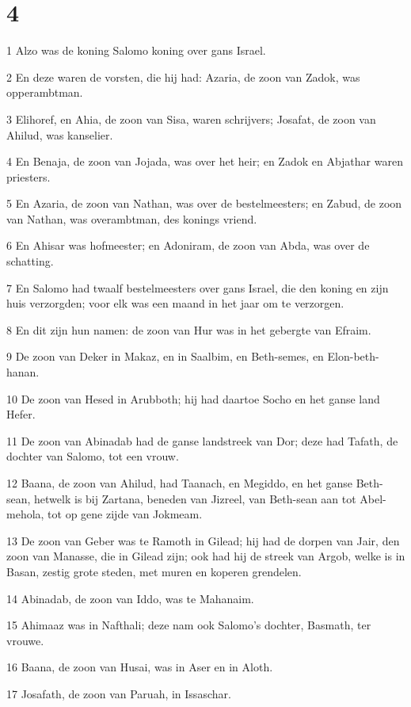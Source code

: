 \chapter{4}

\par 1 Alzo was de koning Salomo koning over gans Israel.
\par 2 En deze waren de vorsten, die hij had: Azaria, de zoon van Zadok, was opperambtman.
\par 3 Elihoref, en Ahia, de zoon van Sisa, waren schrijvers; Josafat, de zoon van Ahilud, was kanselier.
\par 4 En Benaja, de zoon van Jojada, was over het heir; en Zadok en Abjathar waren priesters.
\par 5 En Azaria, de zoon van Nathan, was over de bestelmeesters; en Zabud, de zoon van Nathan, was overambtman, des konings vriend.
\par 6 En Ahisar was hofmeester; en Adoniram, de zoon van Abda, was over de schatting.
\par 7 En Salomo had twaalf bestelmeesters over gans Israel, die den koning en zijn huis verzorgden; voor elk was een maand in het jaar om te verzorgen.
\par 8 En dit zijn hun namen: de zoon van Hur was in het gebergte van Efraim.
\par 9 De zoon van Deker in Makaz, en in Saalbim, en Beth-semes, en Elon-beth-hanan.
\par 10 De zoon van Hesed in Arubboth; hij had daartoe Socho en het ganse land Hefer.
\par 11 De zoon van Abinadab had de ganse landstreek van Dor; deze had Tafath, de dochter van Salomo, tot een vrouw.
\par 12 Baana, de zoon van Ahilud, had Taanach, en Megiddo, en het ganse Beth-sean, hetwelk is bij Zartana, beneden van Jizreel, van Beth-sean aan tot Abel-mehola, tot op gene zijde van Jokmeam.
\par 13 De zoon van Geber was te Ramoth in Gilead; hij had de dorpen van Jair, den zoon van Manasse, die in Gilead zijn; ook had hij de streek van Argob, welke is in Basan, zestig grote steden, met muren en koperen grendelen.
\par 14 Abinadab, de zoon van Iddo, was te Mahanaim.
\par 15 Ahimaaz was in Nafthali; deze nam ook Salomo's dochter, Basmath, ter vrouwe.
\par 16 Baana, de zoon van Husai, was in Aser en in Aloth.
\par 17 Josafath, de zoon van Paruah, in Issaschar.
